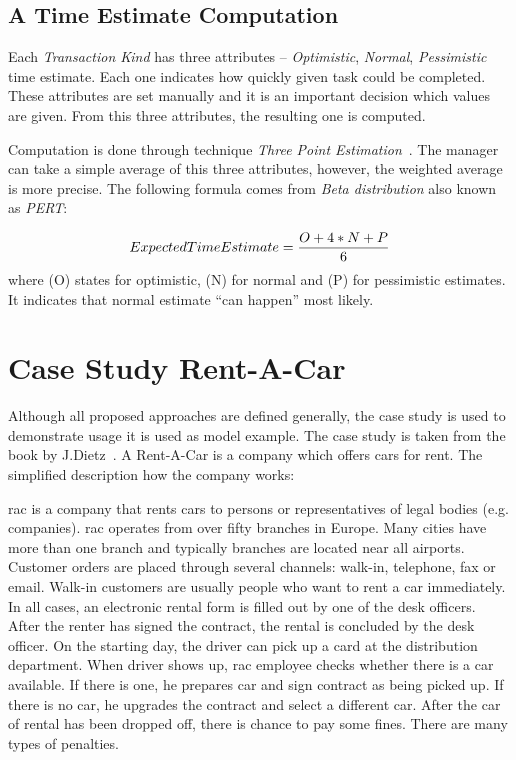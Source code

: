 \subsection{A Time Estimate Computation}
Each \textit{Transaction Kind} has three attributes -- \textit{Optimistic}, \textit{Normal}, \textit{Pessimistic} time estimate. Each one indicates how quickly given task could be completed. These attributes are set manually and it is an important decision which values are given. From this three attributes, the resulting one is computed.  

Computation is done through technique \textit{Three Point Estimation}~\cite{beta-distribution}. 
The manager can take a simple average of this three attributes, however, the weighted average is more precise.
The following formula comes from \textit{Beta distribution} also known as \textit{PERT}:

\begin{displaymath}
\centering
ExpectedTimeEstimate = \frac{O + 4*N + P}{6}
\end{displaymath}
where (O) states for optimistic, (N) for normal and (P) for pessimistic estimates. It indicates that normal estimate ``can happen'' most likely.
\section{Case Study Rent-A-Car}
Although all proposed approaches are defined generally, the case study is used to demonstrate usage it is used as model example. The case study is taken from the book by J.Dietz~\cite{dietz-essence-2015}. A Rent-A-Car is a company which offers cars for rent. The simplified description how the company works:

\gls{rac} is a company that rents cars to persons or representatives of legal bodies (e.g. companies). \gls{rac} operates from over fifty branches in Europe. Many cities have more than one branch and typically branches are located near all airports. 
Customer orders are placed through several channels: walk-in, telephone, fax or email. Walk-in customers are usually people who want to rent a car immediately. In all cases, an electronic rental form is filled out by one of the desk officers. 
After the renter has signed the contract, the rental is concluded by the desk officer. On the starting day, the driver can pick up a card at the distribution department. When driver shows up, \gls{rac} employee checks whether there is a car available. If there is one, he prepares car and sign contract as being picked up. If there is no car, he upgrades the contract and select a different car. 
After the car of rental has been dropped off, there is chance to pay some fines. There are many types of penalties.

